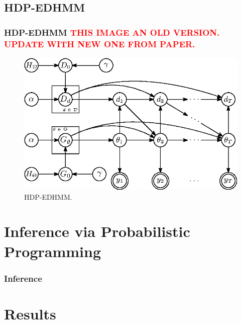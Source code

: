 \documentclass[aspectratio=169]{beamer}
\begin{document}

\subsection{HDP-EDHMM}
\begin{frame}
    \frametitle{HDP-EDHMM \textcolor{red}{THIS IMAGE AN OLD VERSION. UPDATE WITH NEW ONE FROM PAPER.}}

    \begin{figure}
        \includegraphics[width=1.0\linewidth]{HDPEDHMM.eps}
        \caption{HDP-EDHMM.}
    \end{figure}


\end{frame}


\section{Inference via Probabilistic Programming}
\begin{frame}
    \frametitle{Inference}

\end{frame}


\section{Results}
\end{document}

